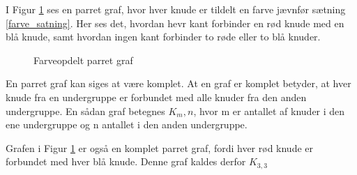 \begin{exmp}
	I Figur \ref{farve_graf} ses en parret graf, hvor hver knude er tildelt en farve jævnfør sætning \ref{farve_satning}. 
	Her ses det, hvordan hevr kant forbinder en rød knude med en blå knude, samt hvordan ingen kant forbinder to røde eller to blå knuder.
	
	\begin{figure}[h!]
		\centering
		
		\caption{Farveopdelt parret graf}\label{farve_graf}
	\end{figure}
\end{exmp}

En parret graf kan siges at være komplet. 
At en graf er komplet betyder, at hver knude fra en undergruppe er forbundet med alle knuder fra den anden undergruppe. 
En sådan graf betegnes $K_m,n$, hvor m er antallet af knuder i den ene undergruppe og n antallet i den anden undergruppe. 

\begin{exmp}
Grafen i Figur \ref{farve_graf} er også en komplet parret graf, fordi hver rød knude er forbundet med hver blå knude. 
Denne graf kaldes derfor $K_{3,3}$
\end{exmp}
